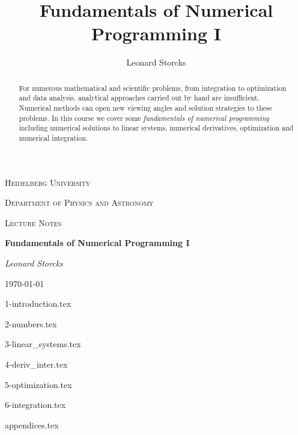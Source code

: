 \documentclass[a4paper, 12pt]{article}
\title{Fundamentals of Numerical Programming I}
\author{Leonard Storcks}
\theoremstyle{definition}
\begin{document}
\begin{titlepage}
	\centering
	{\scshape\LARGE Heidelberg University \par}
	\vspace{0.5cm}
	{\scshape\LARGE Department of Physics and Astronomy \par}
	\vspace{1cm}
	{\scshape\Large Lecture Notes\par}
	\vspace{1.5cm}
	{\huge\bfseries Fundamentals of Numerical Programming I \par}
	\vspace{2cm}
	{\Large\itshape Leonard Storcks\par}
	\vfill
    \par
	\vfill
\vfill
	{\large \today\par}
\end{titlepage}

\begin{abstract}
  For numerous mathematical and scientific problems, from integration to 
  optimization and data analysis, analytical approaches carried out by hand are insufficient. 
  Numerical methods can open new viewing angles and solution strategies to these problems.
  In this course we cover some \textit{fundamentals of numerical programming} including
  numerical solutions to linear systems, numerical derivatives, optimization
  and numerical integration.
\end{abstract}

\thispagestyle{empty}

\pagebreak

\thispagestyle{plain}

\tableofcontents

\thispagestyle{empty}

\pagebreak

\setcounter{page}{1} %



{1-introduction.tex}

{2-numbers.tex}

{3-linear_systems.tex}

{4-deriv_inter.tex}

{5-optimization.tex}

{6-integration.tex}


\pagebreak
\thispagestyle{plain}
\printbibliography[title={References}]
\pagebreak


{appendices.tex}

\end{document}
